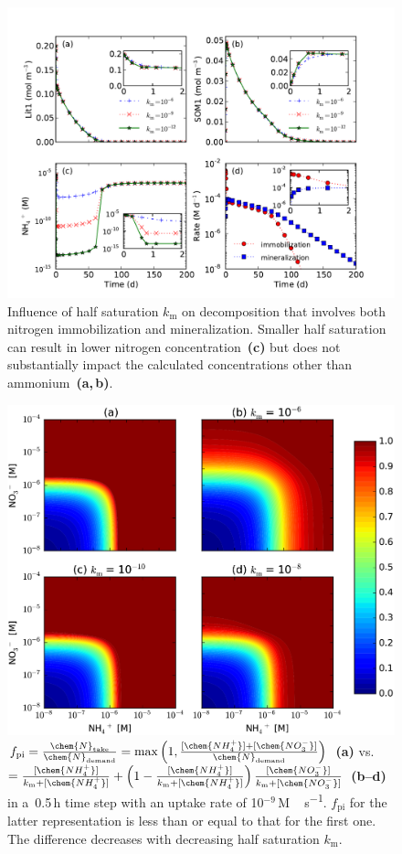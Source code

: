 \documentclass[gmdd, online, hvmath]{copernicus}
\begin{document}
\begin{figure}
\includegraphics[width=120mm]{gmd-2015-254-discussions-f02.pdf}
\caption{Influence of half saturation $k_\mathrm{m}$ on decomposition that involves both nitrogen immobilization and mineralization. Smaller half saturation can result in lower nitrogen concentration~\textbf{(c)} but does not substantially impact the calculated concentrations other than ammonium~\textbf{(a,\,b)}.}
\label{fig:decomp}
\end{figure}



\begin{figure}
\includegraphics[width=120mm]{gmd-2015-254-discussions-f03.png}
\caption{$f_{\text{pi}}=\frac{\chem{N}_\text{take}}{\chem{N}_\text{demand}}=\max\left(1,\frac{[\chem{NH_4^+}]+[\chem{NO_3^-}]}{\chem{N}_\text{demand}}\right)$~\textbf{(a)} vs. $=\frac{[\chem{NH_4^+}]}{k_\mathrm{m}+[\chem{NH_4^+}]}+\left(1-\frac{[\chem{NH_4^+}]}{k_\mathrm{m}+[\chem{NH_4^+}]}\right)\frac{[\chem{NO_3^-}]}{k_\mathrm{m}+[\chem{NO_3^-}]}$~\textbf{(b--d)} in a~0.5\,h time step with an uptake rate of 10$^{-9}$\,\unit{M\,s^{-1}}. $f_{\text{pi}}$ for the latter representation is less than or equal to that for the first one. The difference decreases with decreasing half saturation $k_\mathrm{m}$.}
\label{fig:demanddistribution}
\end{figure}
\end{document}
